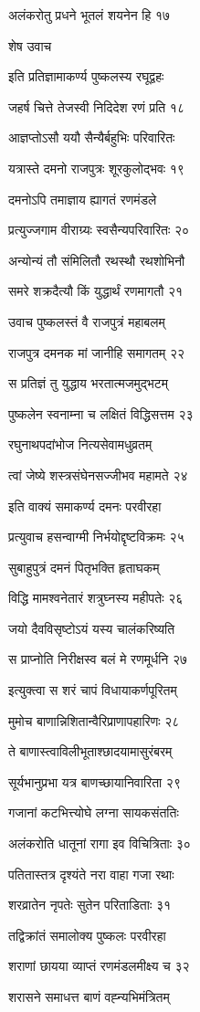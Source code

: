 अलंकरोतु प्रधने भूतलं शयनेन हि १७

शेष उवाच

इति प्रतिज्ञामाकर्ण्य पुष्कलस्य रघूद्वहः

जहर्ष चित्ते तेजस्वी निदिदेश रणं प्रति १८

आज्ञप्तोऽसौ ययौ सैन्यैर्बहुभिः परिवारितः

यत्रास्ते दमनो राजपुत्रः शूरकुलोद्भवः १९

दमनोऽपि तमाज्ञाय ह्यागतं रणमंडले

प्रत्युज्जगाम वीराग्र्यः स्वसैन्यपरिवारितः २०

अन्योन्यं तौ संमिलितौ रथस्थौ रथशोभिनौ

समरे शक्रदैत्यौ किं युद्धार्थं रणमागतौ २१

उवाच पुष्कलस्तं वै राजपुत्रं महाबलम्

राजपुत्र दमनक मां जानीहि समागतम् २२

स प्रतिज्ञं तु युद्धाय भरतात्मजमुद्भटम्

पुष्कलेन स्वनाम्ना च लक्षितं विद्धिसत्तम २३

रघुनाथपदांभोज नित्यसेवामधुव्रतम्

त्वां जेष्ये शस्त्रसंघेनसज्जीभव महामते २४

इति वाक्यं समाकर्ण्य दमनः परवीरहा

प्रत्युवाच हसन्वाग्मी निर्भयोद्दृष्टविक्रमः २५

सुबाहुपुत्रं दमनं पितृभक्ति हृताघकम्

विद्धि मामश्वनेतारं शत्रुघ्नस्य महीपतेः २६

जयो दैवविसृष्टोऽयं यस्य चालंकरिष्यति

स प्राप्नोति निरीक्षस्व बलं मे रणमूर्धनि २७

इत्युक्त्वा स शरं चापं विधायाकर्णपूरितम्

मुमोच बाणान्निशितान्वैरिप्राणापहारिणः २८

ते बाणास्त्वाविलीभूताश्छादयामासुरंबरम्

सूर्यभानुप्रभा यत्र बाणच्छायानिवारिता २९

गजानां कटभित्त्योघे लग्ना सायकसंततिः

अलंकरोति धातूनां रागा इव विचित्रिताः ३०

पतितास्तत्र दृश्यंते नरा वाहा गजा रथाः

शरव्रातेन नृपतेः सुतेन परिताडिताः ३१

तद्विक्रांतं समालोक्य पुष्कलः परवीरहा

शराणां छायया व्याप्तं रणमंडलमीक्ष्य च ३२

शरासने समाधत्त बाणं वह्न्यभिमंत्रितम्

